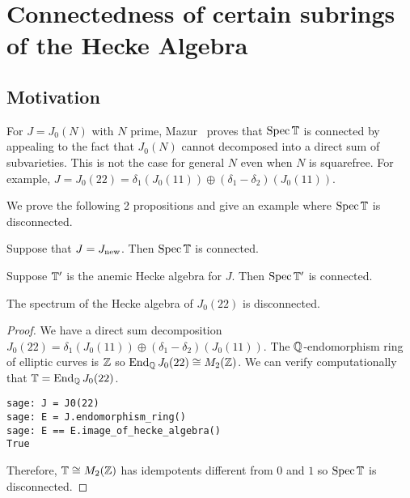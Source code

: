 \documentclass{article}
\begin{document}
\section{Connectedness of certain subrings of the Hecke Algebra}

\subsection{Motivation}

For $J=J_0(N)$ with $N$ prime, Mazur~\cite[Proposition 10.6]{mazur:eisenstein}
proves that $\operatorname{Spec} \mathbb{T}$ is connected by appealing to the fact that $J_0(N)$
cannot decomposed into a direct sum of subvarieties. This is not the case for
general $N$ even when $N$ is squarefree. For example,
$J=J_0(22)=\delta_1(J_0(11))\oplus (\delta_1-\delta_2)(J_0(11))$.

We prove the following 2 propositions and give an example where $\operatorname{Spec}\mathbb{T}$ is
disconnected.

\begin{proposition}
    Suppose that $J=J_{\operatorname{new}}$. Then $\operatorname{Spec}\mathbb{T}$ is connected.
\end{proposition}

\begin{proposition}
    Suppose $\mathbb{T}'$ is the anemic Hecke algebra for $J$. Then $\operatorname{Spec}\mathbb{T}'$ is connected.
\end{proposition}
\setcounter{theorem}{9}
\begin{example}
    The spectrum of the Hecke algebra of $J_0(22)$ is disconnected.
\end{example}
\begin{proof}
    We have a direct sum decomposition $J_0(22)=\delta_1(J_0(11))\oplus
    (\delta_1-\delta_2)(J_0(11))$. The $\mathbb{Q}$-endomorphism ring of elliptic curves is
    $\mathbb{Z}$ so $\operatorname{End}_{\mathbb{Q}} J_0(22)\cong M_2(\mathbb{Z})$. We can verify computationally
    that $\mathbb{T}=\operatorname{End}_{\mathbb{Q}} J_0(22)$.
    \begin{lstlisting}[language=Sage]
sage: J = J0(22)
sage: E = J.endomorphism_ring()
sage: E == E.image_of_hecke_algebra()
True
    \end{lstlisting}
    Therefore, $\mathbb{T} \cong M_2(\mathbb{Z})$ has idempotents different from $0$ and $1$
    so $\operatorname{Spec} \mathbb{T}$ is disconnected.
\end{proof}
\end{document}
